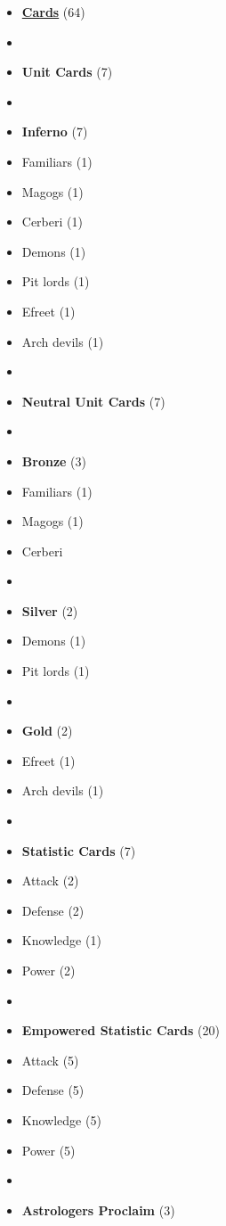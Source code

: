 \begin{multicols*}{3}
\begin{itemize}[leftmargin=0pt, label={}, noitemsep]
  \item \textbf{\small{\underline{Cards}}} (64)
  \item
  \item \textbf{Unit Cards} (7)
  \item
  \item \textbf{Inferno} (7)
  \item Familiars (1)
  \item Magogs (1)
  \item Cerberi (1)
  \item Demons (1)
  \item Pit lords (1)
  \item Efreet (1)
  \item Arch devils (1)
  \item
  \item \textbf{Neutral Unit Cards} (7)
  \item
  \item \textbf{Bronze} (3)
  \item Familiars (1)
  \item Magogs (1)
  \item Cerberi
  \item
  \item \textbf{Silver} (2)
  \item Demons (1)
  \item Pit lords (1)
  \item
  \item \textbf{Gold} (2)
  \item Efreet (1)
  \item Arch devils (1)
  \item
  \item \textbf{Statistic Cards} (7)
  \item Attack (2)
  \item Defense (2)
  \item Knowledge (1)
  \item Power (2)
  \item
  \item \textbf{Empowered Statistic Cards} (20)
  \item Attack (5)
  \item Defense (5)
  \item Knowledge (5)
  \item Power (5)
  \item
  \item \textbf{Astrologers Proclaim} (3)

\end{itemize}
\end{multicols*}
